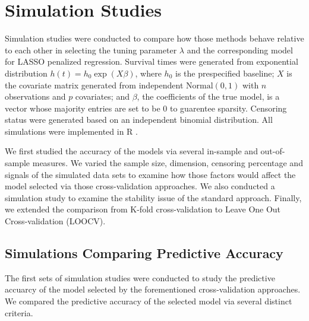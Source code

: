 \section{Simulation Studies}

Simulation studies were conducted to compare how those methods behave relative to each other in selecting the tuning parameter $\lambda$ and the corresponding model for LASSO penalized regression. Survival times were generated from exponential distribution $h(t) = h_{0} \exp(X\beta)$, where $h_{0}$ is the prespecified baseline; $X$ is the covariate matrix generated from independent $\text{Normal}(0, 1)$ with $n$ observations and $p$ covariates; and $\beta$, the coefficients of the true model, is a vector whose majority entries are set to be 0 to guarentee sparsity. Censoring status were generated based on an independent binomial distribution. All simulations were implemented in R \citep{R}.

We first studied the accuracy of the models via several in-sample and out-of-sample measures. We varied the sample size, dimension, censoring percentage and signals of the simulated data sets to examine how those factors would affect the model selected via those cross-validation approaches. We also conducted a simulation study to examine the stability issue of the standard approach. Finally, we extended the comparison from K-fold cross-validation to Leave One Out Cross-validation (LOOCV).
   
    \subsection {Simulations Comparing Predictive Accuracy}
\par The first sets of simulation studies were conducted to study the predictive accuarcy of the model selected by the forementioned cross-validation approaches. We compared the predictive accuracy of the selected model via several distinct criteria.

